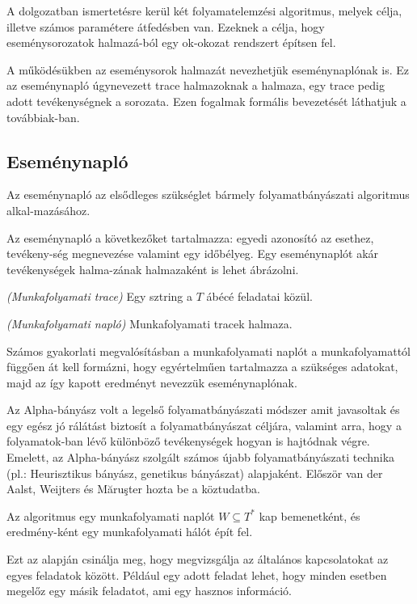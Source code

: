 
A dolgozatban ismertetésre kerül két folyamatelemzési algoritmus, melyek célja, illetve számos paramétere átfedésben van. Ezeknek a célja, hogy eseménysorozatok halmazá\hyp{}ból egy ok-okozat rendszert építsen fel.

A működésükben az eseménysorok halmazát nevezhetjük eseménynaplónak is. Ez az eseménynapló úgynevezett trace halmazoknak a halmaza, egy trace pedig adott tevékenységnek a sorozata. Ezen fogalmak formális bevezetését láthatjuk a továbbiak\hyp{}ban.

\subsection{Eseménynapló}
Az eseménynapló az elsődleges szükséglet bármely folyamatbányászati algoritmus alkal\hyp{}mazásához.

Az eseménynapló a következőket tartalmazza: egyedi azonosító az esethez, tevékeny\hyp{}ség megnevezése valamint egy időbélyeg. Egy eseménynaplót akár tevékenységek halma\hyp{}zának halmazaként is lehet ábrázolni.

\begin{definition}{\textit{(Munkafolyamati trace)}} Egy sztring a $T$ ábécé feladatai közül.\end{definition}
\begin{definition}{\textit{(Munkafolyamati napló)}} Munkafolyamati tracek halmaza.\end{definition}

Számos gyakorlati megvalósításban a munkafolyamati naplót a munkafolyamattól függően át kell formázni, hogy egyértelműen tartalmazza a szükséges adatokat, majd az így kapott eredményt nevezzük eseménynaplónak.


Az Alpha-bányász volt a legelső folyamatbányászati módszer amit javasoltak és egy egész jó rálátást biztosít a folyamatbányászat céljára, valamint arra, hogy a folyamatok\hyp{}ban lévő különböző tevékenységek hogyan is hajtódnak végre. Emelett, az Alpha\hyp{}bányász szolgált számos újabb folyamatbányászati technika (pl.: Heurisztikus bányász, genetikus bányászat) alapjaként. Először van der Aalst, Weijters és Măruşter hozta be a köztudatba. 

Az algoritmus egy munkafolyamati naplót $W \subseteq  T^*$ kap bemenetként, és eredmény\hyp{}ként egy munkafolyamati hálót épít fel.

Ezt az alapján csinálja meg, hogy megvizsgálja az általános kapcsolatokat az egyes feladatok között. Például egy adott feladat lehet, hogy minden esetben megelőz egy másik feladatot, ami egy hasznos információ.

